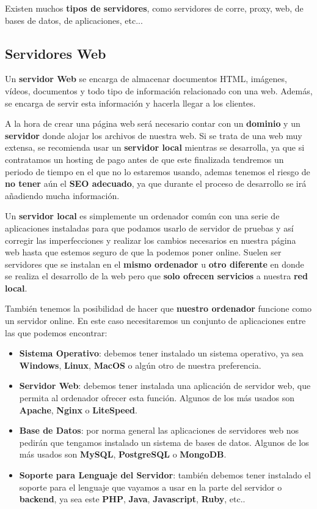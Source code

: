 Existen muchos \textbf{tipos de servidores}, como servidores de corre, proxy, web, de bases de datos, de aplicaciones, etc...

\subsection{Servidores Web}
Un \textbf{servidor Web} se encarga de almacenar documentos HTML, imágenes, vídeos, documentos y todo tipo de información relacionado con una web. Además, se encarga de servir esta información y hacerla llegar a los clientes.

A la hora de crear una página web será necesario contar con un \textbf{dominio} y un \textbf{servidor} donde alojar los archivos de nuestra web. Si se trata de una web muy extensa, se recomienda usar un \textbf{servidor local} mientras se desarrolla, ya que si contratamos un hosting de pago antes de que este finalizada tendremos un periodo de tiempo en el que no lo estaremos usando, ademas tenemos el riesgo de \textbf{no tener} aún el \textbf{SEO adecuado}, ya que durante el proceso de desarrollo se irá añadiendo mucha información.

Un \textbf{servidor local} es simplemente un ordenador común con una serie de aplicaciones instaladas para que podamos usarlo de servidor de pruebas y así corregir las imperfecciones y realizar los cambios necesarios en nuestra página web hasta que estemos seguro de que la podemos poner online. Suelen ser servidores que se instalan en el \textbf{mismo ordenador} u \textbf{otro diferente} en donde se realiza el desarrollo de la web pero que \textbf{solo ofrecen servicios} a nuestra \textbf{red local}.

También tenemos la posibilidad de hacer que \textbf{nuestro ordenador} funcione como un servidor online. En este caso necesitaremos un conjunto de aplicaciones entre las que podemos encontrar:

\begin{itemize}
    \item \textbf{Sistema Operativo}: debemos tener instalado un sistema operativo, ya sea \textbf{Windows}, \textbf{Linux}, \textbf{MacOS} o algún otro de nuestra preferencia.
    \item \textbf{Servidor Web}: debemos tener instalada una aplicación de servidor web, que permita al ordenador ofrecer esta función. Algunos de los más usados son \textbf{Apache}, \textbf{Nginx} o \textbf{LiteSpeed}.
    \item \textbf{Base de Datos}: por norma general las aplicaciones de servidores web nos pedirán que tengamos instalado un sistema de bases de datos. Algunos de los más usados son \textbf{MySQL}, \textbf{PostgreSQL} o \textbf{MongoDB}.
    \item \textbf{Soporte para Lenguaje del Servidor}: también debemos tener instalado el soporte para el lenguaje que vayamos a usar en la parte del servidor o \textbf{backend}, ya sea este \textbf{PHP}, \textbf{Java}, \textbf{Javascript}, \textbf{Ruby}, etc..
\end{itemize}

